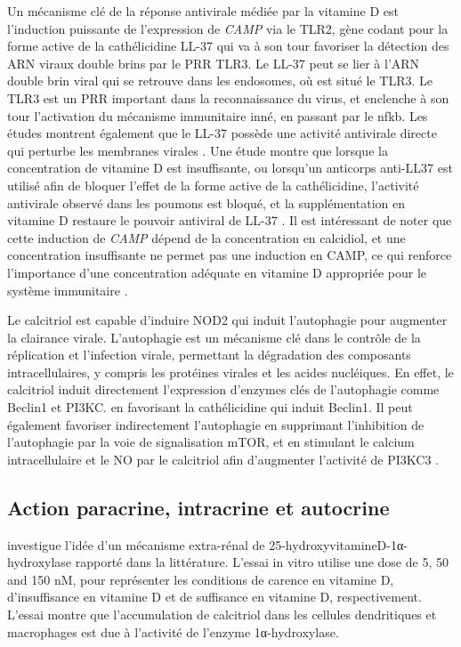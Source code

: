 \documentclass[
  a4paper,
  DIV=11,
  numbers=noendperiod,
  listof=totoc]{scrreprt}
\begin{document}
Un mécanisme clé de la réponse antivirale médiée par la vitamine D est
l'induction puissante de l'expression de \emph{CAMP} via le TLR2, gène
codant pour la forme active de la cathélicidine LL-37 qui va à son tour
favoriser la détection des ARN viraux double brins par le \ac{PRR} TLR3.
Le LL-37 peut se lier à l'ARN double brin viral qui se retrouve dans les
endosomes, où est situé le TLR3. Le TLR3 est un \ac{PRR} important dans
la reconnaissance du virus, et enclenche à son tour l'activation du
mécanisme immunitaire inné, en passant par le \ac{nfkb}. Les études
montrent également que le LL-37 possède une activité antivirale directe
qui perturbe les membranes virales \autocite{Bishop.2021}. Une étude
montre que lorsque la concentration de vitamine D est insuffisante, ou
lorsqu'un anticorps anti-LL37 est utilisé afin de bloquer l'effet de la
forme active de la cathélicidine, l'activité antivirale observé dans les
poumons est bloqué, et la supplémentation en vitamine D restaure le
pouvoir antiviral de LL-37 \autocite{Buonfiglio.2017}. Il est
intéressant de noter que cette induction de \emph{CAMP} dépend de la
concentration en calcidiol, et une concentration insuffisante ne permet
pas une induction en CAMP, ce qui renforce l'importance d'une
concentration adéquate en vitamine D appropriée pour le système
immunitaire \autocite{White.2022}.

Le calcitriol est capable d'induire NOD2 qui induit l'autophagie pour
augmenter la clairance virale. L'autophagie est un mécanisme clé dans le
contrôle de la réplication et l'infection virale, permettant la
dégradation des composants intracellulaires, y compris les protéines
virales et les acides nucléiques. En effet, le calcitriol induit
directement l'expression d'enzymes clés de l'autophagie comme Beclin1 et
PI3KC. en favorisant la cathélicidine qui induit Beclin1. Il peut
également favoriser indirectement l'autophagie en supprimant
l'inhibition de l'autophagie par la voie de signalisation mTOR, et en
stimulant le calcium intracellulaire et le \ac{NO} par le calcitriol
afin d'augmenter l'activité de PI3KC3 \autocite{Bishop.2021}.

\subsection{Action paracrine, intracrine et
autocrine}\label{action-paracrine-intracrine-et-autocrine}

\textcite{Hewison.2007} investigue l'idée d'un mécanisme extra-rénal de
25-hydroxyvitamineD-1α-hydroxylase rapporté dans la littérature. L'essai
in vitro utilise une dose de 5, 50 and 150 nM, pour représenter les
conditions de carence en vitamine D, d'insuffisance en vitamine D et de
suffisance en vitamine D, respectivement. L'essai montre que
l'accumulation de calcitriol dans les cellules dendritiques et
macrophages est due à l'activité de l'enzyme 1α-hydroxylase.
\end{document}
